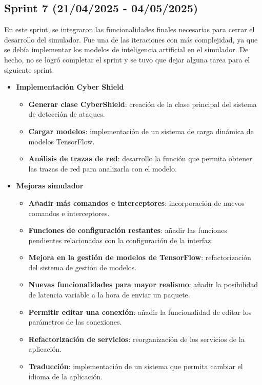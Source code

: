 \subsection{Sprint 7 (21/04/2025 - 04/05/2025)}
\label{subsec:SeptimoSprint}
En este sprint, se integraron las funcionalidades finales necesarias para cerrar el desarrollo del simulador. Fue una de las iteraciones con más complejidad, ya que se debía implementar los modelos de inteligencia artificial en el simulador. De hecho, no se logró completar el sprint y se tuvo que dejar alguna tarea para el siguiente sprint.

\begin{itemize}
    \item \textbf{Implementación Cyber Shield}
    \begin{itemize}
        \item \textbf{Generar clase CyberShield}: creación de la clase principal del sistema de detección de ataques.
        \item \textbf{Cargar modelos}: implementación de un sistema de carga dinámica de modelos TensorFlow.
        \item \textbf{Análisis de trazas de red}: desarrollo la función que permita obtener las trazas de red para analizarla con el modelo.
    \end{itemize}
    \item \textbf{Mejoras simulador}
    \begin{itemize}
        \item \textbf{Añadir más comandos e interceptores}: incorporación de nuevos comandos e interceptores.
        \item \textbf{Funciones de configuración restantes}: añadir las funciones pendientes relacionadas con la configuración de la interfaz.
        \item \textbf{Mejora en la gestión de modelos de TensorFlow}: refactorización del sistema de gestión de modelos.
        \item \textbf{Nuevas funcionalidades para mayor realismo}: añadir la posibilidad de latencia variable a la hora de enviar un paquete.
        \item \textbf{Permitir editar una conexión}: añadir la funcionalidad de editar los parámetros de las conexiones.
        \item \textbf{Refactorización de servicios}: reorganización de los servicios de la aplicación.
        \item \textbf{Traducción}: implementación de un sistema que permita cambiar el idioma de la aplicación.
    \end{itemize}
\end{itemize}


